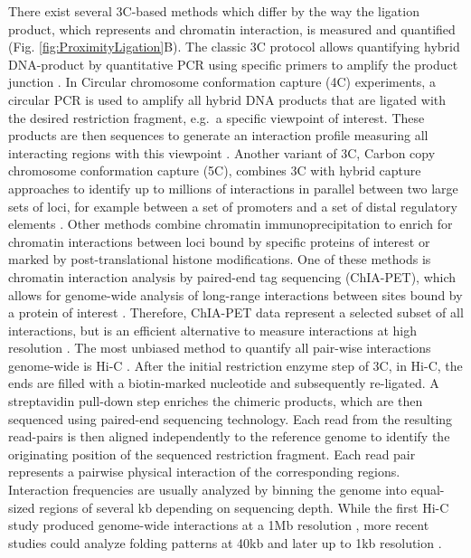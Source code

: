 \documentclass[a4paper,twoside=true,openright,parskip=full,chapterprefix=true,11pt,headings=normal,bibliography=totoc,listof=totoc,titlepage=on,captions=tableabove,draft=false]{scrreprt}
\theoremstyle{definition}
\theoremstyle{definition}
\theoremstyle{definition}
\theoremstyle{remark}
\begin{document}
There exist several 3C-based methods which differ by the way the
ligation product, which represents and chromatin interaction, is
measured and quantified (Fig. \ref{fig:ProximityLigation}B). The classic
3C protocol allows quantifying hybrid DNA-product by quantitative PCR
using specific primers to amplify the product junction
\citep{Dekker2002}. In Circular chromosome conformation capture (4C)
experiments, a circular PCR is used to amplify all hybrid DNA products
that are ligated with the desired restriction fragment, e.g.~a specific
viewpoint of interest. These products are then sequences to generate an
interaction profile measuring all interacting regions with this
viewpoint \citep{Simonis2006, Noordermeer2011}. Another variant of 3C,
Carbon copy chromosome conformation capture (5C), combines 3C with
hybrid capture approaches to identify up to millions of interactions in
parallel between two large sets of loci, for example between a set of
promoters and a set of distal regulatory elements
\citep{Dostie2006, Sanyal2012}. Other methods combine chromatin
immunoprecipitation to enrich for chromatin interactions between loci
bound by specific proteins of interest or marked by post-translational
histone modifications. One of these methods is chromatin interaction
analysis by paired-end tag sequencing (ChIA-PET), which allows for
genome-wide analysis of long-range interactions between sites bound by a
protein of interest \citep{Fullwood2009}. Therefore, ChIA-PET data
represent a selected subset of all interactions, but is an efficient
alternative to measure interactions at high resolution \citep{Tang2015}.
The most unbiased method to quantify all pair-wise interactions
genome-wide is Hi-C \citep{Lieberman-Aiden2009}. After the initial
restriction enzyme step of 3C, in Hi-C, the ends are filled with a
biotin-marked nucleotide and subsequently re-ligated. A streptavidin
pull-down step enriches the chimeric products, which are then sequenced
using paired-end sequencing technology. Each read from the resulting
read-pairs is then aligned independently to the reference genome to
identify the originating position of the sequenced restriction fragment.
Each read pair represents a pairwise physical interaction of the
corresponding regions. Interaction frequencies are usually analyzed by
binning the genome into equal-sized regions of several kb depending on
sequencing depth. While the first Hi-C study produced genome-wide
interactions at a 1Mb resolution \citep{Lieberman-Aiden2009}, more
recent studies could analyze folding patterns at 40kb \citep{Dixon2012}
and later up to 1kb resolution \citep{Rao2014}.
\end{document}
